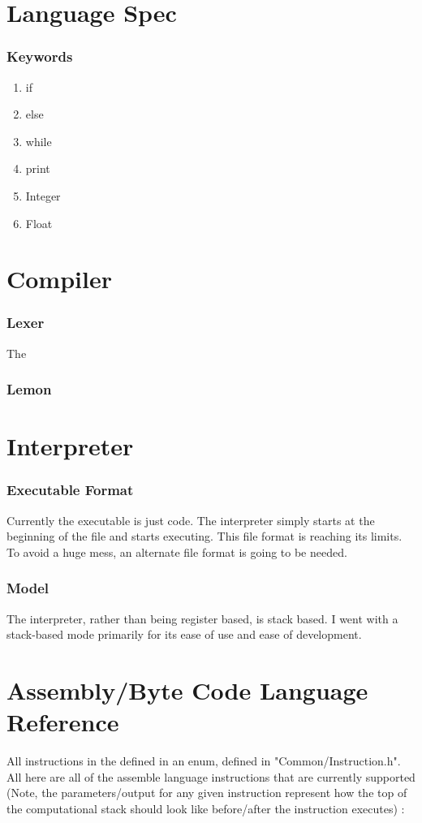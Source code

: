 \documentclass{report}
\begin{document}
\tableofcontents
\chapter{Language Spec}
	\subsection{Keywords}
		\begin{enumerate}
			\item if
			\item else
			\item while
			\item print
			\item Integer
			\item Float
		\end{enumerate}
	
\chapter{Compiler}
	\subsection{Lexer}
		The
	\subsection{Lemon}
\chapter{Interpreter}
	\subsection{Executable Format}
	Currently the executable is just code. The interpreter simply starts at the beginning of the file and starts executing.
	This file format is reaching its limits. To avoid a huge mess, an alternate file format is going to be needed. 
	\subsection{Model}
	The interpreter, rather than being register based, is stack based. I went with a stack-based mode primarily for its ease of use and ease of development. 

\chapter{Assembly/Byte Code Language Reference}
	All instructions in the defined in an enum, defined in "Common/Instruction.h".
	All here are all of the assemble language instructions that are currently supported (Note, the parameters/output for any given instruction represent how the top of the computational stack should look like before/after the instruction executes) :
\end{document}
